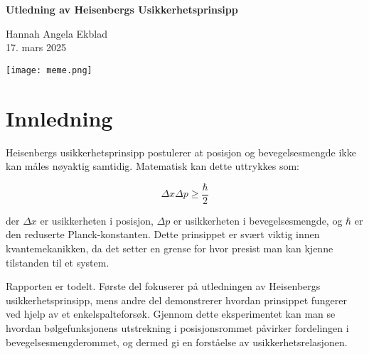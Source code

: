 \documentclass{article}
\begin{document}
       \begin{titlepage}
		\centering
		\vspace*{1in}

		{\Huge \textbf{Utledning av Heisenbergs Usikkerhetsprinsipp}} \\
		\vspace{0.5in}


		{\Large Hannah Angela Ekblad} \\
		\vspace{0.5in}
        {\Large 17. mars 2025} \\
		\vspace{0.4in}
    

		\vfill
		\begin{center}
		    \texttt{[image: meme.png]}
		\end{center}
		
		\vspace{1in}
    \end{titlepage}


\tableofcontents
\newpage

\section{Innledning}

Heisenbergs usikkerhetsprinsipp postulerer at posisjon og bevegelsesmengde ikke kan måles nøyaktig samtidig. Matematisk kan dette uttrykkes som:

\begin{equation*}
    \Delta x \Delta p \geq \frac{\hbar}{2}
\end{equation*}

der $\Delta x$ er usikkerheten i posisjon, $\Delta p$ er usikkerheten i bevegelsesmengde, og $\hbar$ er den reduserte Planck-konstanten. Dette prinsippet er svært viktig innen kvantemekanikken, da det setter en grense for hvor presist man kan kjenne tilstanden til et system. 

Rapporten er todelt. Første del fokuserer på utledningen av Heisenbergs usikkerhetsprinsipp, mens andre del demonstrerer hvordan prinsippet fungerer ved hjelp av et enkelspalteforsøk. Gjennom dette eksperimentet kan man se hvordan bølgefunksjonens utstrekning i posisjonsrommet påvirker fordelingen i bevegelsesmengderommet, og dermed gi en forståelse av usikkerhetsrelasjonen.

\vspace{0.2in}
\end{document}
